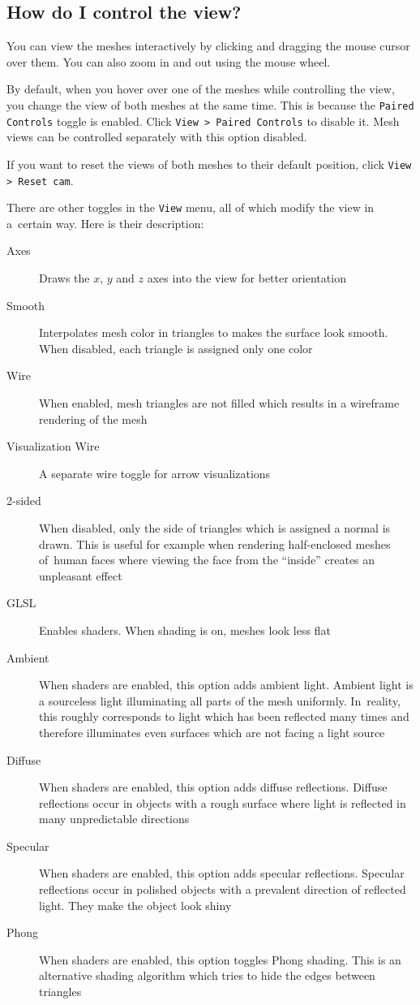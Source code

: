 \subsection{How do I control the view?}
\label{attch:user_doc-view_control}

You can view the meshes interactively by clicking and dragging the mouse cursor over them. You can also zoom in and out using the mouse wheel.

By default, when you hover over one of the meshes while controlling the view, you change the view of both meshes at the same time. This is because the \verb+Paired Controls+ toggle is enabled. Click \verb+View > Paired Controls+ to disable it. Mesh views can be controlled separately with this option disabled.

If you want to reset the views of both meshes to their default position, click \verb+View > Reset cam+.

There are other toggles in the \verb+View+ menu, all of which modify the view in a~certain way. Here is their description:

\begin{description}
\item [Axes] Draws the \(x\), \(y\) and \(z\) axes into the view for better orientation
\item [Smooth] Interpolates mesh color in triangles to makes the surface look smooth. When disabled, each triangle is assigned only one color
\item [Wire] When enabled, mesh triangles are not filled which results in a wireframe rendering of the mesh
\item [Visualization Wire] A separate wire toggle for arrow visualizations
\item [2-sided] When disabled, only the side of triangles which is assigned a normal is drawn. This is useful for example when rendering half-enclosed meshes of~human faces where viewing the face from the ``inside'' creates an unpleasant effect
\item [GLSL] Enables shaders. When shading is on, meshes look less flat
\item [Ambient] When shaders are enabled, this option adds ambient light. Ambient light is a sourceless light illuminating all parts of the mesh uniformly. In~reality, this roughly corresponds to light which has been reflected many times and therefore illuminates even surfaces which are not facing a light source 
\item [Diffuse] When shaders are enabled, this option adds diffuse reflections. Diffuse reflections occur in objects with a rough surface where light is reflected in many unpredictable directions
\item [Specular] When shaders are enabled, this option adds specular reflections. Specular reflections occur in polished objects with a prevalent direction of reflected light. They make the object look shiny
\item [Phong] When shaders are enabled, this option toggles Phong shading. This is an alternative shading algorithm which tries to hide the edges between triangles
\end{description}


